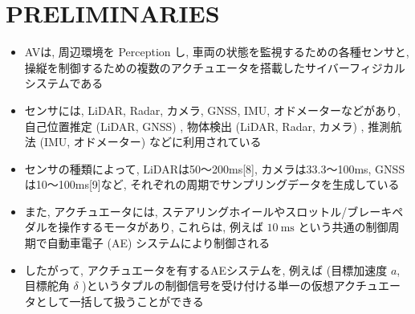 
\section{PRELIMINARIES}
\label{sec: preliminaries}

\begin{frame}{}
    \begin{itemize}
        \item AVは, 周辺環境を Perception し, 車両の状態を監視するための各種センサと, 操縦を制御するための複数のアクチュエータを搭載したサイバーフィジカルシステムである
        \item センサには, LiDAR, Radar, カメラ, GNSS, IMU, オドメーターなどがあり, 自己位置推定 (LiDAR, GNSS) , 物体検出 (LiDAR, Radar, カメラ) , 推測航法 (IMU, オドメーター) などに利用されている
        \item センサの種類によって, LiDARは50～200ms[8], カメラは33.3～100ms, GNSSは10～100ms[9]など, それぞれの周期でサンプリングデータを生成している
    \end{itemize}
\end{frame}
\begin{frame}{}
    \begin{itemize}
        \item また, アクチュエータには, ステアリングホイールやスロットル/ブレーキペダルを操作するモータがあり, これらは, 例えば $10 \mathrm{~ms}$ という共通の制御周期で自動車電子 (AE) システムにより制御される
        \item したがって, アクチュエータを有するAEシステムを, 例えば (目標加速度 $a$, 目標舵角 $\delta$ )というタプルの制御信号を受け付ける単一の仮想アクチュエータとして一括して扱うことができる
    \end{itemize}
\end{frame}

\begin{frame}{}
\end{frame}

